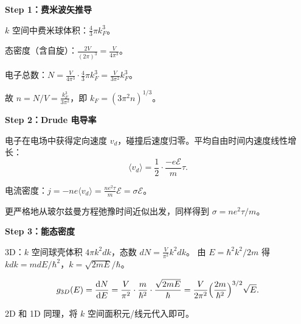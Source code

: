 \begin{derivationbox}
\textbf{Step 1：费米波矢推导}

$k$ 空间中费米球体积：$\frac{4}{3}\pi k_F^3$。

态密度（含自旋）：$\frac{2V}{(2\pi)^3}=\frac{V}{4\pi^3}$。

电子总数：$N=\frac{V}{4\pi^3}\cdot\frac{4}{3}\pi k_F^3=\frac{V}{3\pi^2}k_F^3$。

故 $n=N/V=\frac{k_F^3}{3\pi^2}$，即 $k_F=(3\pi^2 n)^{1/3}$。

\textbf{Step 2：Drude 电导率}

电子在电场中获得定向速度 $v_d$，碰撞后速度归零。平均自由时间内速度线性增长：
\[
\langle v_d\rangle=\frac{1}{2}\cdot\frac{-e\mathcal{E}}{m}\tau.
\]

电流密度：$j=-ne\langle v_d\rangle=\frac{ne^2\tau}{m}\mathcal{E}=\sigma\mathcal{E}$。

更严格地从玻尔兹曼方程弛豫时间近似出发，同样得到 $\sigma=ne^2\tau/m$。

\textbf{Step 3：能态密度}

3D：$k$ 空间球壳体积 $4\pi k^2dk$，态数 $dN=\frac{V}{\pi^2}k^2dk$。
由 $E=\hbar^2k^2/2m$ 得 $kdk=m dE/\hbar^2$，$k=\sqrt{2mE}/\hbar$。

\[
g_{3D}(E)=\frac{\dd N}{\dd E}=\frac{V}{\pi^2}\cdot\frac{m}{\hbar^2}\cdot\frac{\sqrt{2mE}}{\hbar}
=\frac{V}{2\pi^2}\Bigl(\frac{2m}{\hbar^2}\Bigr)^{3/2}\sqrt{E}.
\]

2D 和 1D 同理，将 $k$ 空间面积元/线元代入即可。
\end{derivationbox}

\vspace{1em}
